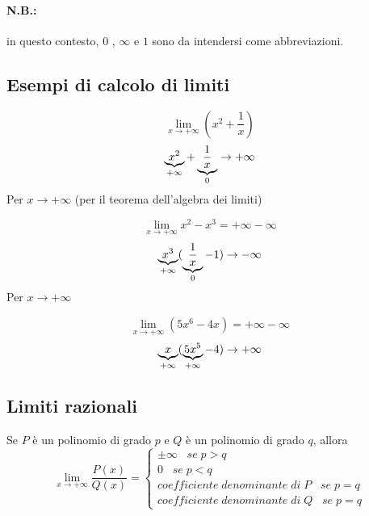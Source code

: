 \documentclass[a4paper]{article}
\theoremstyle{break}
\theoremstyle{break}
\theoremstyle{break}
\theoremstyle{break}
\begin{document}
\paragraph{\textbf{N.B.:}} in questo contesto, \( 0 \) , \( \infty \) e \( 1 \) sono da intendersi
come abbreviazioni.

\subsection{Esempi di calcolo di limiti}
\begin{example}
  \[ \lim_{x \to +\infty} (x^2+\frac{1}{x})  \]
  \[
    \underbrace{x^2}_\text{\( +\infty \)} + \underbrace{\frac{1}{x}}_\text{\( 0 \)} \to +\infty
  \]
  Per \( x \to +\infty \) (per il teorema dell'algebra dei limiti)
\end{example}
\begin{example}
  \[
    \lim_{x \to +\infty} x^2-x^3 = +\infty - \infty
  \]
  \[
    \underbrace{x^3}_\text{\( +\infty \)}(\underbrace{\frac{1}{x}}_\text{\( 0 \)} - 1) \to -\infty
  \]
  Per \( x \to +\infty \)
\end{example}
\begin{example}
  \[
    \lim_{x \to +\infty} (5x^6-4x) = +\infty - \infty
  \]
  \[
    \underbrace{x}_\text{\( +\infty \)}(\underbrace{5x^5}_\text{\( +\infty \)} - 4) \to +\infty
  \]
\end{example}


\subsection{Limiti razionali}
Se \( P \) è un polinomio di grado \( p \) e \( Q \) è un polinomio di grado \( q \), allora
\[
  \lim_{x \to +\infty} \frac{P(x)}{Q(x)}=
  \begin{cases}
    \pm \infty\;\;\; se\; p > q                          \\
    0\;\;\; se\; p < q                                   \\
    coefficiente\; denominante\; di\; P\;\;\; se\; p = q \\
    coefficiente\; denominante\; di\; Q\;\;\; se\; p = q
  \end{cases}
\]
\end{document}
